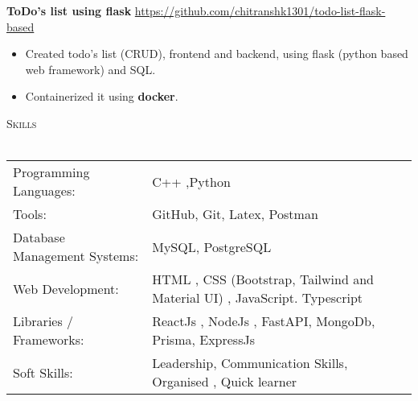 \documentclass[a4paper]{article}
\newcommand{\lineunder} {
    \vspace*{-8pt} \\
    \hspace*{-18pt} \hrulefill \\
}
\newcommand{\header} [1] {
    {\hspace*{-18pt}\vspace*{6pt} \textsc{#1}}
    \vspace*{-6pt} \lineunder
}
\begin{document}
{\textbf{ToDo's list using flask}} \hfill
\vspace{-1mm}
\url{https://github.com/chitranshk1301/todo-list-flask-based}
\vspace{-1mm}
\begin{itemize} 
    \item Created todo's list (CRUD), frontend and backend, using flask (python based web framework) and SQL.
    \item Containerized it using \textbf{docker}.
    
\end{itemize}

    


    \header{Skills}
\vspace{2mm}
\begin{tabular}{ l l }
	Programming Languages: & C++ ,Python  \\
	\vspace{1mm}
	Tools:  & GitHub, Git, Latex, Postman \\
	Database Management Systems: & MySQL, PostgreSQL  \\ 
	Web Development:       & HTML , CSS (Bootstrap, Tailwind and Material UI) , JavaScript. Typescript   \\
	Libraries / Frameworks: & ReactJs , NodeJs , FastAPI, MongoDb, Prisma, ExpressJs        \\
	Soft Skills:           &  Leadership, Communication Skills, Organised , Quick learner  \\
	
\end{tabular}
\vspace{2mm}
 
\end{document}
